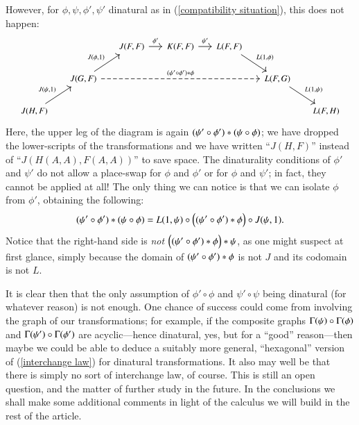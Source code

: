 However, for $\phi, \psi, \phi',\psi'$ dinatural as in (\ref{compatibility situation}), this does not happen:
\[
\begin{tikzcd}[column sep=.5cm,font=\small]
& & J(F,F) \ar[r,"\phi'"] & K(F,F) \ar[r,"\psi'"] & L(F,F) \ar[dr,"{L(1,\phi)}"] \\
& J(G,F) \ar[ur,"{J(\phi,1)}"] \ar[rrrr,dashed,"\hc {\phi} {({\psi'}\circ{\phi'})}"] & & & & L(F,G) \ar[dr,"{L(1,\psi)}"]\\
J(H,F) \ar[ur,"{J(\psi,1)}"] & & & & & & L(F,H)
\end{tikzcd}
\]
Here, the upper leg of the diagram is again $\hc {(\psi \circ \phi)} {(\psi' \circ \phi')}$; we have dropped the lower-scripts of the transformations and we have written ``$J(H,F)$'' instead of ``$J(H(A,A),F(A,A))$'' to save space. The dinaturality conditions of $\phi'$ and $\psi'$ do not allow a place-swap for $\phi$ and $\phi'$ or for $\phi$ and $\psi'$; in fact, they cannot be applied at all! The only thing we can notice is that we can isolate $\phi$ from $\phi'$, obtaining the following:
\[
\hc {(\psi \circ \phi)} {(\psi' \circ \phi')} = L(1,\psi) \circ \Bigl(\hc {\phi} {({\psi'}\circ{\phi'})}\Bigr) \circ J(\psi,1).
\]
Notice that the right-hand side is \emph{not} $\hc \psi {\Bigl(\hc {\phi} {({\psi'}\circ{\phi'})}\Bigr)}$, as one might suspect at first glance, simply because the domain of $\hc {\phi} {({\psi'}\circ{\phi'})}$ is not $J$ and its codomain is not $L$. 

It is clear then that the only assumption of $\phi'\circ\phi$ and $\psi'\circ\psi$ being dinatural (for whatever reason) is not enough. One chance of success could come from involving the graph of our transformations; for example, if the composite graphs $\graph\psi \circ \graph\phi$ and $\graph{\psi'} \circ \graph{\phi'}$ are acyclic—hence dinatural, yes, but for a ``good'' reason—then maybe we could be able to deduce a suitably more general, ``hexagonal'' version of (\ref{interchange law}) for dinatural transformations. It also may well be that there is simply no sort of interchange law, of course. This is still an open question, and the matter of further study in the future. In the conclusions we shall make some additional comments in light of the calculus we will build in the rest of the article.
